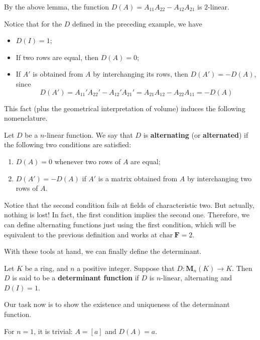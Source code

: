 \begin{example}
	By the above lemma, the function $D(A) = A_{11}A_{22} - A_{12}A_{21}$ is $2$-linear. 
\end{example}

Notice that for the $D$ defined in the preceding example, we have
\begin{itemize}
	\item $D(I) = 1$;
	\item If two rows are equal, then $D(A) = 0$; 
	\item If $A'$ is obtained from $A$ by interchanging its rows, then $D(A') = - D(A)$, since \[ D(A') = A_{11}'A_{22}' - A_{12}'A_{21}' = A_{21}A_{12} - A_{22}A_{11} = -D(A) \]
\end{itemize}

This fact (plus the geometrical interpretation of volume) induces the following nomenclature.

\begin{definition}[Alternating]
	Let $D$ be a $n$-linear function. We say that $D$ is \textbf{alternating} (or \textbf{alternated}) if the following two conditions are satisfied:
	\begin{enumerate}
		\item $D(A) = 0$ whenever two rows of $A$ are equal;
		\item $D(A') = -D(A)$ if $A'$ is a matrix obtained from $A$ by interchanging two rows of $A$.
	\end{enumerate}
\end{definition}

Notice that the second condition fails at fields of characteristic two. But actually, nothing is lost! In fact, the first condition implies the second one. Therefore, we can define alternating functions just using the first condition, which will be equivalent to the previous definition and works at $\text{char} ~\textbf{F} = 2$.

With these tools at hand, we can finally define the determinant.

\begin{definition}[Determinant]
	Let $K$ be a ring, and $n$ a positive integer. Suppose that $D : \textbf{M}_n(K) \longrightarrow K$. Then $D$ is said to be a \textbf{determinant function} if $D$ is $n$-linear, alternating and $D(I) = 1$.
\end{definition}

Our task now is to show the existence and uniqueness of the determinant function.

For $n = 1$, it is trivial: $A = [a]$ and $D(A) = a$.

